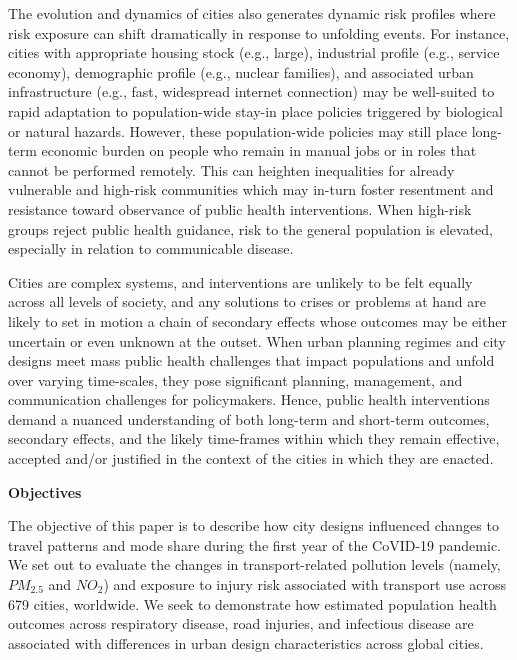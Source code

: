 \documentclass[preprint,12pt]{elsarticle}
\begin{document}
The evolution and dynamics of cities also generates dynamic risk profiles where risk exposure can shift dramatically in response to unfolding events. For instance, cities with appropriate housing stock (e.g., large), industrial profile (e.g., service economy), demographic profile (e.g., nuclear families), and associated urban infrastructure (e.g., fast, widespread internet connection) may be well-suited to rapid adaptation to population-wide stay-in place policies triggered by biological or natural hazards\cite{hale2021global}. However, these population-wide policies may still place long-term economic burden on people who remain in manual jobs or in roles that cannot be performed remotely\cite{CraigWFH,Vyas2021}. This can heighten inequalities for already vulnerable and high-risk communities\cite{martin2020fighting} which may in-turn foster resentment and resistance toward observance of public health interventions\cite{de2016sustainability}. When high-risk groups reject public health guidance, risk to the general population is elevated, especially in relation to communicable disease\cite{koopman2005control}.

Cities are complex systems\cite{DiezRoux2015}, and interventions are unlikely to be felt equally across all levels of society, and any solutions to crises or problems at hand are likely to set in motion a chain of secondary effects whose outcomes may be either uncertain or even unknown at the outset\cite{Sterman2006}. When urban planning regimes and city designs meet mass public health challenges that impact populations and unfold over varying time-scales\cite{casti2012x}, they pose significant planning, management, and communication challenges for policymakers\cite{thompson2022modelling,thompson2022framework}. Hence, public health interventions demand a nuanced understanding of both long-term and short-term  outcomes, secondary effects, and the likely time-frames within which they remain effective, accepted and/or justified in the context of the cities in which they are enacted\cite{dawson2016snakes, oliu2021sars}.


\textbf{Objectives}

The objective of this paper is to describe how city designs influenced changes to travel patterns and mode share during the first year of the CoVID-19 pandemic. We set out to evaluate the changes in transport-related pollution levels (namely, \(PM_{2.5}\) and \(NO_{2}\)) and exposure to injury risk associated with transport use across 679 cities, worldwide. We seek to demonstrate how estimated population health outcomes across respiratory disease, road injuries, and infectious disease are associated with differences in urban design characteristics across global cities.
\end{document}

